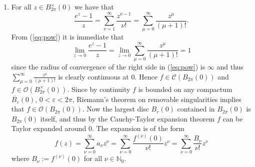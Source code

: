 \begin{enumerate}[label = \textbf{Exercise \arabic*.},wide = 0pt, itemsep=1.5ex]
\begin{enumerate}[label = (\alph*),wide = 0pt, itemsep=1.5ex]
				\begin{proof}
					Proof by induction over $\nu \in \mathbb{N}_0$. For $\nu = 0$ the equation clearly holds. Assume it is true for some $\nu \in \mathbb{N}_0$. Then 
					\begin{equation}
						f^{(\nu + 1)}(z_0) = \del[1]{f^{(\nu)}}'(z_0) = (-1)^\nu \nu! (-(\nu + 1))\frac{1}{z_0^{\nu + 2}} = (-1)^{\nu + 1}\frac{(\nu + 1)!}{z_0^{\nu + 2}}.
					\end{equation}
				\end{proof}

				Since $F^{(\nu)}(z_0)/\nu! = f^{(\nu - 1)}(z_0)/\nu !$ for all $\nu \in \mathbb{N}$, lemma \ref{lem:derf} implies that 
				\begin{equation}
					\boxed{F = F(z_0) + \sum_{\nu = 1}^\infty\frac{(-1)^{\nu - 1}}{\nu}\frac{1}{z_0^\nu} (z - z_0)^\nu \qquad z \in B_r(z_0).}
				\end{equation}
				By
				\begin{equation}
					\limsup_{\nu \to \infty} \abs[3]{\frac{(-1)^{\nu - 1}}{\nu}\frac{1}{z_0^\nu}}^{1/\nu} = \frac{1}{\abs[0]{z_0}}\limsup_{\nu \to \infty}\frac{1}{\nu^{1/\nu}} = \frac{1}{\abs[0]{z_0}}\lim_{\nu \to \infty}\frac{1}{\nu^{1/\nu}} = \frac{1}{\abs[0]{z_0}}
				\end{equation}
				\noindent we see that $R = \abs[0]{z_0}$ using the Cauchy-Hadamard formula.
		\end{enumerate}

	\item
		For all $z \in B^\times_{2\pi}(0)$ we have that
		\begin{equation}
			\frac{e^z - 1}{z} = \sum_{\nu = 1}^{\infty}\frac{z^{\nu - 1}}{\nu !} = \sum_{\mu = 0}^\infty \frac{z^\mu}{(\mu + 1)!}.
			\label{eq:pow}
		\end{equation} 
		From (\ref{eq:pow}) it is immediate that
		\begin{equation}
			\lim_{z \to 0}\frac{e^z - 1}{z} = \lim_{z \to 0} \sum_{\mu = 0}^\infty \frac{z^\mu}{(\mu + 1)!} = 1
		\end{equation}
		\noindent since the radius of convergence of the right side in (\ref{eq:pow}) is $\infty$ and thus $\sum_{\mu = 0}^\infty \frac{z^\mu}{(\mu + 1)!}$ is clearly continuous at $0$. Hence $f \in \mathscr{C}(B_{2\pi}(0))$ and $f \in \mathcal{O}(B^\times_{2\pi}(0))$. Since by continuity $f$ is bounded on any compactum $\overline{B_\varepsilon}(0)$, $0 < \varepsilon < 2\pi$, Riemann's theorem on removable singularities implies that $f \in \mathcal{O}(B_{2\pi}(0))$. Now the largest disc $B_{r}(0)$ contained in $B_{2\pi}(0)$ is $B_{2\pi}(0)$ itself, and thus by the Cauchy-Taylor expansion theorem $f$ can be Taylor expanded around $0$. The expansion is of the form
		\begin{equation}
			f(z) = \sum_{\nu = 0}^\infty a_\nu z^\nu = \sum_{\nu = 0}^\infty \frac{f^{(\nu)}(0)}{\nu !}z^\nu = \sum_{\nu = 0}^\infty \frac{B_\nu}{\nu !}z^\nu
		\end{equation}
		\noindent where $B_\nu := f^{(\nu)}(0)$ for all $\nu \in \mathbb{N}_0$.
		

\end{enumerate}
